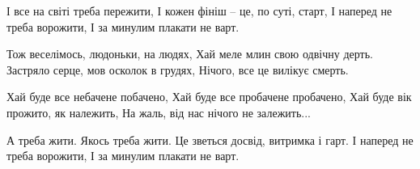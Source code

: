  
 
 

І все на світі треба пережити, 
І кожен фініш – це, по суті, старт, 
І наперед не треба ворожити, 
І за минулим плакати не варт. 

Тож веселімось, людоньки, на людях, 
Хай меле млин свою одвічну дерть. 
Застряло серце, мов осколок в грудях, 
Нічого, все це вилікує смерть. 

Хай буде все небачене побачено, 
Хай буде все пробачене пробачено, 
Хай буде вік прожито, як належить, 
На жаль, від нас нічого не залежить... 

А треба жити. Якось треба жити. 
Це зветься досвід, витримка і гарт. 
І наперед не треба ворожити, 
І за минулим плакати не варт.
